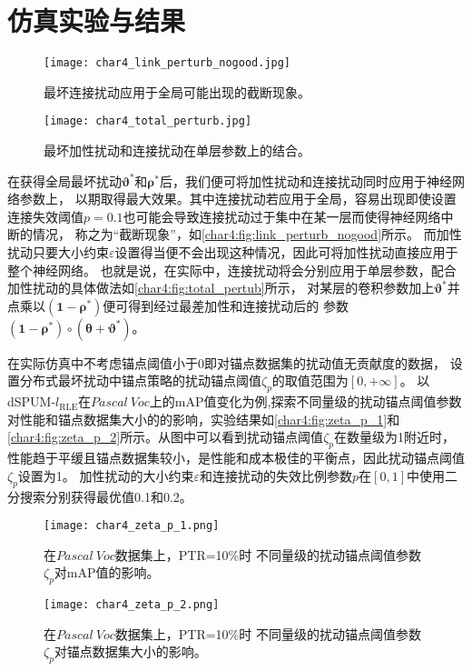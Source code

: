 \section{仿真实验与结果}\label{Char4_Experiments}
\begin{figure}
    \centering
    \texttt{[image: char4\_link\_perturb\_nogood.jpg]}
    \caption{\label{char4:fig:link_perturb_nogood}最坏连接扰动应用于全局可能出现的截断现象。}
\end{figure}
\begin{figure}
    \centering
    \texttt{[image: char4\_total\_perturb.jpg]}
    \caption{\label{char4:fig:total_pertub}最坏加性扰动和连接扰动在单层参数上的结合。}
\end{figure}
在获得全局最坏扰动$\boldsymbol \vartheta^*$和$\boldsymbol \rho^*$后，我们便可将加性扰动和连接扰动同时{应用于}神经网络参数上，
以期取得最大效果。其中连接扰动若应用于全局，容易出现即使设置连接失效阈值$p=0.1$也可能会导致连接扰动过于集中在某一层而使得神经网络中断的情况，
称之为“截断现象”，如\autoref{char4:fig:link_perturb_nogood}所示。
而加性扰动只要大小约束$\varepsilon$设置得当便不会出现这种情况，因此可将加性扰动直接应用于整个神经网络。
也就是说，在实际中，{连接扰动}将会分别应用于单层参数，配合加性扰动的具体做法如\autoref{char4:fig:total_pertub}所示，
对某层的卷积参数加上$\boldsymbol \vartheta^*$并点乘以$\left(\boldsymbol 1-\boldsymbol \rho^*\right)$便可得到经过最差加性和连接扰动后的
参数$\left(\boldsymbol 1-\boldsymbol \rho^*\right)\circ\left(\boldsymbol \theta+\boldsymbol \vartheta^* \right)$。

在实际仿真中不考虑锚点阈值小于0即对锚点数据集的扰动值无贡献度的数据，
设置分布式最坏扰动中锚点策略的扰动锚点阈值$\zeta_p$的取值范围为$\left[0,+\infty\right]$。
以dSPUM-$l_{\mathrm{RLE}}$在$Pascal~Voc$上的mAP值变化为例,探索不同量级的扰动锚点阈值参数对性能和锚点数据集大小的的影响，实验结果如\autoref{char4:fig:zeta_p_1}和\autoref{char4:fig:zeta_p_2}所示。从图中可以看到扰动锚点阈值$\zeta_p$在数量级为1附近时，
性能趋于平缓且锚点数据集较小，是性能和成本极佳的平衡点，因此扰动锚点阈值$\zeta_p$设置为1。
加性扰动的大小约束$\varepsilon$和连接扰动的失效比例参数$p$在$\left[0,1\right]$中使用二分搜索分别获得最优值0.1和0.2。
\begin{figure}[htbp]
    \centering
    \texttt{[image: char4\_zeta\_p\_1.png]}
    \caption{\label{char4:fig:zeta_p_1}在$Pascal~Voc$数据集上，PTR=10\%时
    不同量级的扰动锚点阈值参数$\zeta_p$对mAP值的影响。}
\end{figure}
\begin{figure}[htbp]
    \centering
    \texttt{[image: char4\_zeta\_p\_2.png]}
    \caption{\label{char4:fig:zeta_p_2}在$Pascal~Voc$数据集上，PTR=10\%时
    不同量级的扰动锚点阈值参数$\zeta_p$对锚点数据集大小的影响。}
\end{figure}

